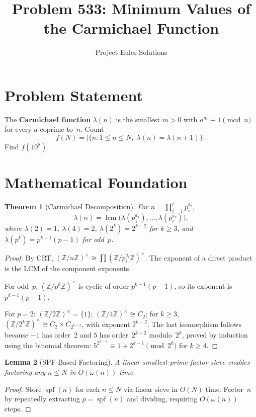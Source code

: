 \documentclass[11pt]{article}
\title{Problem 533: Minimum Values of the Carmichael Function}
\author{Project Euler Solutions}
\date{}
\newtheorem{theorem}{Theorem}
\newtheorem{lemma}[theorem]{Lemma}
\begin{document}
\maketitle

\section{Problem Statement}

The \textbf{Carmichael function} $\lambda(n)$ is the smallest $m > 0$ with $a^m \equiv 1 \pmod{n}$ for every $a$ coprime to~$n$. Count
\[
f(N) = \bigl|\{n : 1 \le n \le N,\;\lambda(n) = \lambda(n+1)\}\bigr|.
\]
Find $f(10^8)$.

\section{Mathematical Foundation}

\begin{theorem}[Carmichael Decomposition]
For $n = \prod_{i=1}^{r} p_i^{a_i}$,
\[
\lambda(n) = \operatorname{lcm}\bigl(\lambda(p_1^{a_1}),\ldots,\lambda(p_r^{a_r})\bigr),
\]
where $\lambda(2) = 1$, $\lambda(4) = 2$, $\lambda(2^k) = 2^{k-2}$ for $k \ge 3$, and $\lambda(p^k) = p^{k-1}(p-1)$ for odd~$p$.
\end{theorem}

\begin{proof}
By CRT, $(\mathbb{Z}/n\mathbb{Z})^\times \cong \prod (\mathbb{Z}/p_i^{a_i}\mathbb{Z})^\times$. The exponent of a direct product is the LCM of the component exponents.

For odd~$p$, $(\mathbb{Z}/p^k\mathbb{Z})^\times$ is cyclic of order $p^{k-1}(p-1)$, so its exponent is $p^{k-1}(p-1)$.

For $p = 2$: $(\mathbb{Z}/2\mathbb{Z})^\times = \{1\}$; $(\mathbb{Z}/4\mathbb{Z})^\times \cong C_2$; for $k \ge 3$, $(\mathbb{Z}/2^k\mathbb{Z})^\times \cong C_2 \times C_{2^{k-2}}$, with exponent $2^{k-2}$. The last isomorphism follows because $-1$ has order~2 and $5$ has order~$2^{k-2}$ modulo~$2^k$, proved by induction using the binomial theorem: $5^{2^{k-3}} \equiv 1 + 2^{k-1} \pmod{2^k}$ for $k \ge 4$.
\end{proof}

\begin{lemma}[SPF-Based Factoring]
A linear smallest-prime-factor sieve enables factoring any $n \le N$ in $O(\omega(n))$ time.
\end{lemma}

\begin{proof}
Store $\operatorname{spf}(n)$ for each $n \le N$ via linear sieve in $O(N)$ time. Factor~$n$ by repeatedly extracting $p = \operatorname{spf}(n)$ and dividing, requiring $O(\omega(n))$ steps.
\end{proof}
\end{document}
